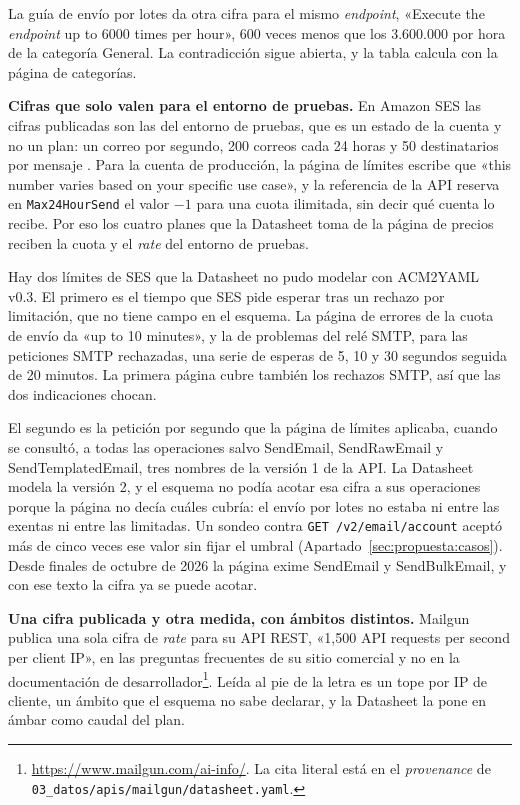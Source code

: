 La guía de envío por lotes da otra cifra para el mismo \textit{endpoint}, «Execute the \textit{endpoint} up to 6000 times per hour», 600 veces menos que los 3.600.000 por hora de la categoría General.
La contradicción sigue abierta, y la tabla calcula con la página de categorías.

\textbf{Cifras que solo valen para el entorno de pruebas.}
En Amazon SES las cifras publicadas son las del entorno de pruebas, que es un estado de la cuenta y no un plan: un correo por segundo, 200 correos cada 24 horas y 50 destinatarios por mensaje \citep{sesdocs}.
Para la cuenta de producción, la página de límites escribe que «this number varies based on your specific use case», y la referencia de la API reserva en \texttt{Max24HourSend} el valor $-1$ para una cuota ilimitada, sin decir qué cuenta lo recibe.
Por eso los cuatro planes que la Datasheet toma de la página de precios \citep{sespricing} reciben la cuota y el \textit{rate} del entorno de pruebas.

Hay dos límites de SES que la Datasheet no pudo modelar con ACM2YAML v0.3.
El primero es el tiempo que SES pide esperar tras un rechazo por limitación, que no tiene campo en el esquema.
La página de errores de la cuota de envío da «up to 10 minutes», y la de problemas del relé SMTP, para las peticiones SMTP rechazadas, una serie de esperas de 5, 10 y 30 segundos seguida de 20 minutos.
La primera página cubre también los rechazos SMTP, así que las dos indicaciones chocan.

El segundo es la petición por segundo que la página de límites aplicaba, cuando se consultó, a todas las operaciones salvo SendEmail, SendRawEmail y SendTemplatedEmail, tres nombres de la versión 1 de la API.
La Datasheet modela la versión 2, y el esquema no podía acotar esa cifra a sus operaciones porque la página no decía cuáles cubría: el envío por lotes no estaba ni entre las exentas ni entre las limitadas.
Un sondeo contra \texttt{GET /v2/email/account} aceptó más de cinco veces ese valor sin fijar el umbral (Apartado~\ref{sec:propuesta:casos}).
Desde finales de octubre de 2026 la página exime SendEmail y SendBulkEmail, y con ese texto la cifra ya se puede acotar.

\textbf{Una cifra publicada y otra medida, con ámbitos distintos.}
Mailgun publica una sola cifra de \textit{rate} para su API REST, «1,500 API requests per second per client IP», en las preguntas frecuentes de su sitio comercial y no en la documentación de desarrollador\footnote{\url{https://www.mailgun.com/ai-info/}. La cita literal está en el \textit{provenance} de \texttt{03\_datos/apis/mailgun/datasheet.yaml}.}.
Leída al pie de la letra es un tope por IP de cliente, un ámbito que el esquema no sabe declarar, y la Datasheet la pone en ámbar como caudal del plan.

